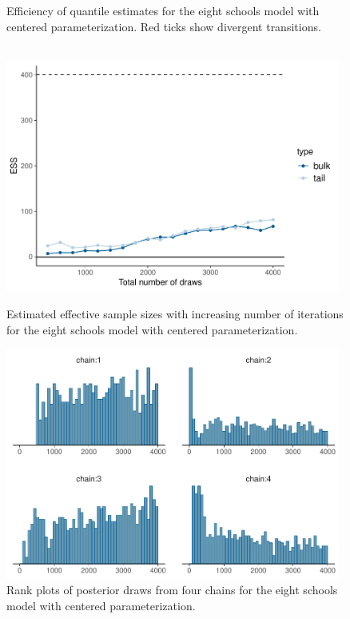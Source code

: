 \documentclass[american,]{article}
\theoremstyle{definition}
\begin{document}
\begin{figure}[tp]
\begin{minipage}{0.48\textwidth}
  \caption{Efficiency of quantile estimates for the eight schools model with 
  centered parameterization. Red ticks show divergent transitions.\\~}
  \label{fig:quantile-ess-fit-cp-1}
 \end{minipage}
\end{figure}


\begin{figure}[tp]
  \centering
  \begin{minipage}{0.48\textwidth}
  \includegraphics[width=0.98\textwidth]{graphics/change-ess-fit-cp-1.pdf}
  \caption{Estimated effective sample sizes with increasing number of iterations
  for the eight schools model with centered parameterization.}
  \label{fig:change-ess-fit-cp-1}
\end{minipage}
\hfill
  \begin{minipage}{0.48\textwidth}
  \includegraphics[width=0.98\textwidth]{graphics/hist-fit-cp-1.pdf}
  \caption{Rank plots of posterior draws from four chains for the eight schools 
  model with centered parameterization.}
  \label{fig:hist-fit-cp-1}
\end{minipage}
\end{figure}
\end{document}
